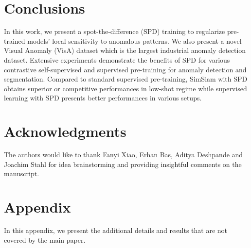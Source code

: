 \section{Conclusions}
In this work, we present a spot-the-difference (SPD) training to regularize pre-trained models' local sensitivity to anomalous patterns. We also present a novel Visual Anomaly (VisA) dataset which is the largest industrial anomaly detection dataset. Extensive experiments demonstrate the benefits of SPD for various contrastive self-supervised and supervised pre-training for anomaly detection and segmentation. Compared to standard supervised pre-training, SimSiam with SPD obtains superior or competitive performances in low-shot regime while supervised learning with SPD presents better performances in various setups. 

\section*{Acknowledgments}
The authors would like to thank Fanyi Xiao, Erhan Bas, Aditya Deshpande and Joachim Stahl for idea brainstorming
and providing insightful comments on the manuscript.

\clearpage

\section*{Appendix}
In this appendix, we present the additional details and
results that are not covered by the main paper.

